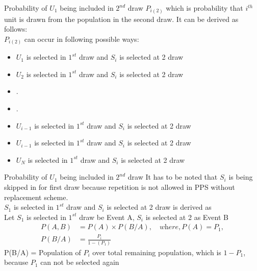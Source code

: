 \documentclass[10pt]{beamer}
\begin{document}
\begin{frame}{Probability of $U_1$ being included in $2^{nd}$ draw}
 $P_{i(2)}$ which is probability that $i^{th}$ unit is drawn from the population in the second draw. It can be derived as follows:\\
$P_{i(2)}$ can occur in following possible ways:\\
\begin{itemize}
    \item $U_1$ is selected in $1^{st}$ draw and $S_i$ is selected at 2 draw
    \item $U_2$ is selected in $1^{st}$ draw and $S_i$ is selected at 2 draw
    \item .
    \item .
    \item $U_{i-1}$ is selected in $1^{st}$ draw and $S_i$ is selected at 2 draw
    \item $U_{i-1}$ is selected in $1^{st}$ draw and $S_i$ is selected at 2 draw
    \item $U_{N}$ is selected in $1^{st}$ draw and $S_i$ is selected at 2 draw
\end{itemize}
\end{frame}

\begin{frame}{Probability of $U_1$ being included in $2^{nd}$ draw}
It has to be noted that $S_i$ is being skipped in for first draw because repetition is not allowed in PPS without replacement scheme.\\
$S_1$ is selected in $1^{st}$ draw and $S_i$ is selected at 2 draw is derived as\\
Let $S_1$ is selected in $1^{st}$ draw be Event A, $S_i$ is selected at 2 as Event B\\
\begin{align*}
P (A,B) &= P(A) \times P(B/A), 
\quad \textit{where}, P(A) = P_1, \\
P(B/A) &=\frac{P_i}{1-(P_1)}
\end{align*}
P(B/A) = Population of $P_i$ over total remaining population, which is $1 - P_1$, because $P_1$ can not be selected again\\
\end{frame}
\end{document}

